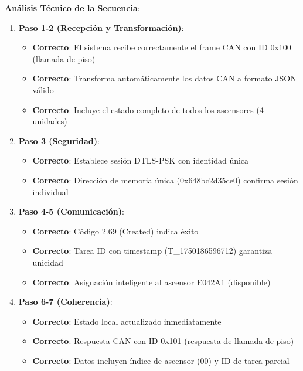 \textbf{Análisis Técnico de la Secuencia}:

\begin{enumerate}
    \item \textbf{Paso 1-2 (Recepción y Transformación)}: 
    \begin{itemize}
        \item \textcolor{successgreen}{\textbf{Correcto}}: El sistema recibe correctamente el frame CAN con ID 0x100 (llamada de piso)
        \item \textcolor{successgreen}{\textbf{Correcto}}: Transforma automáticamente los datos CAN a formato JSON válido
        \item \textcolor{successgreen}{\textbf{Correcto}}: Incluye el estado completo de todos los ascensores (4 unidades)
    \end{itemize}
    
    \item \textbf{Paso 3 (Seguridad)}: 
    \begin{itemize}
        \item \textcolor{successgreen}{\textbf{Correcto}}: Establece sesión DTLS-PSK con identidad única
        \item \textcolor{successgreen}{\textbf{Correcto}}: Dirección de memoria única (0x648bc2d35ce0) confirma sesión individual
    \end{itemize}
    
    \item \textbf{Paso 4-5 (Comunicación)}: 
    \begin{itemize}
        \item \textcolor{successgreen}{\textbf{Correcto}}: Código 2.69 (Created) indica éxito
        \item \textcolor{successgreen}{\textbf{Correcto}}: Tarea ID con timestamp (T\_1750186596712) garantiza unicidad
        \item \textcolor{successgreen}{\textbf{Correcto}}: Asignación inteligente al ascensor E042A1 (disponible)
    \end{itemize}
    
    \item \textbf{Paso 6-7 (Coherencia)}: 
    \begin{itemize}
        \item \textcolor{successgreen}{\textbf{Correcto}}: Estado local actualizado inmediatamente
        \item \textcolor{successgreen}{\textbf{Correcto}}: Respuesta CAN con ID 0x101 (respuesta de llamada de piso)
        \item \textcolor{successgreen}{\textbf{Correcto}}: Datos incluyen índice de ascensor (00) y ID de tarea parcial
    \end{itemize}
\end{enumerate}

